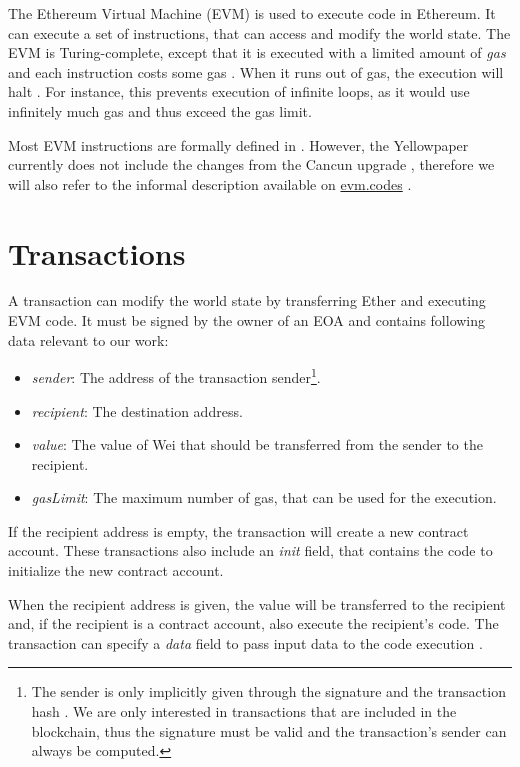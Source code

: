\documentclass[draft,final]{vutinfth} %
\begin{document}
The Ethereum Virtual Machine (EVM) is used to execute code in Ethereum. It can execute a set of instructions, that can access and modify the world state. The EVM is Turing-complete, except that it is executed with a limited amount of \emph{gas} and each instruction costs some gas \cite{wood_ethereum_2024}. When it runs out of gas, the execution will halt \cite[p.14]{wood_ethereum_2024}. For instance, this prevents execution of infinite loops, as it would use infinitely much gas and thus exceed the gas limit.

Most EVM instructions are formally defined in \cite[p.30-38]{wood_ethereum_2024}. However, the Yellowpaper currently does not include the changes from the Cancun upgrade \cite{noauthor_history_2024}, therefore we will also refer to the informal description available on \href{https://www.evm.codes/}{evm.codes} \cite{noauthor_evm_2024}.

\section{Transactions}

A transaction can modify the world state by transferring Ether and executing EVM code. It must be signed by the owner of an EOA and contains following data relevant to our work:

\begin{itemize}
    \item \emph{sender}: The address of the transaction sender\footnote{The sender is only implicitly given through the signature and the transaction hash \cite[p.25-27]{wood_ethereum_2024}. We are only interested in transactions that are included in the blockchain, thus the signature must be valid and the transaction's sender can always be computed.}.
    \item \emph{recipient}: The destination address.
    \item \emph{value}: The value of Wei that should be transferred from the sender to the recipient.
    \item \emph{gasLimit}: The maximum number of gas, that can be used for the execution.
\end{itemize}

If the recipient address is empty, the transaction will create a new contract account. These transactions also include an \emph{init} field, that contains the code to initialize the new contract account.

When the recipient address is given, the value will be transferred to the recipient and, if the recipient is a contract account, also execute the recipient's code. The transaction can specify a \emph{data} field to pass input data to the code execution \cite[p.4-5]{wood_ethereum_2024}.
\end{document}
